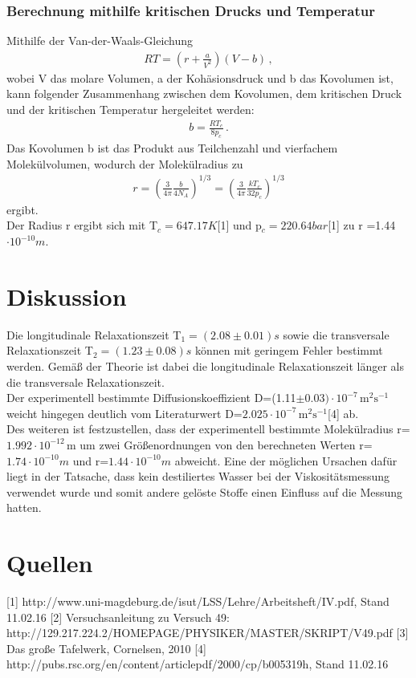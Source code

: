 \documentclass[]{scrartcl}
\begin{document}
\subsubsection{Berechnung mithilfe kritischen Drucks und Temperatur}
Mithilfe der Van-der-Waals-Gleichung 
\begin{align*}
RT = \left( r+\frac{a}{V^2}\right) (V-b)\, ,
\end{align*}
wobei V das molare Volumen, a der Kohäsionsdruck und b das Kovolumen ist, kann folgender Zusammenhang zwischen dem Kovolumen, dem kritischen Druck und der kritischen Temperatur hergeleitet werden:
\begin{align*}
b = \frac{RT_c}{8p_c}\,.
\end{align*}
Das Kovolumen b ist das Produkt aus Teilchenzahl und vierfachem Molekülvolumen, wodurch der Molekülradius zu
\begin{align*}
r= \left( \frac{3}{4\pi}\frac{b}{4N_A}\right) ^{1/3}=\left( \frac{3}{4\pi}\frac{kT_c}{32p_c}\right) ^{1/3}
\end{align*}
ergibt. \\
Der Radius r ergibt sich mit T$_c=647.17\si{K}$[1] und p$_c=220.64\si{bar}$[1] zu r =1.44$\cdot10^{-10}\si{m}$.

\section{Diskussion}
Die longitudinale Relaxationszeit T$_1=(2.08 \pm 0.01)\si{s}$ sowie die transversale Relaxationszeit T$_2=(1.23 \pm 0.08)\si{s}$ können mit geringem Fehler bestimmt werden. Gemäß der Theorie ist dabei die longitudinale Relaxationszeit länger als die transversale Relaxationszeit. \\
Der experimentell bestimmte Diffusionskoeffizient D=(1.11$\pm 0.03) \cdot10^{-7}\,\text{m}^2\text{s}^{-1}$ weicht hingegen deutlich vom Literaturwert D=$2.025\cdot10^{-7}\,\text{m}^2\text{s}^{-1}$[4] ab. \\
Des weiteren ist festzustellen, dass der experimentell bestimmte Molekülradius r=$ 1.992\cdot10^{-12}\,\text{m}$ um zwei Größenordnungen von den berechneten Werten r=$1.74\cdot10^{-10}\si{m}$ und r=$1.44\cdot10^{-10}\si{m}$ abweicht. Eine der möglichen Ursachen dafür liegt in der Tatsache, dass kein destiliertes Wasser bei der Viskositätsmessung verwendet wurde und somit andere gelöste Stoffe einen Einfluss auf die Messung hatten.

\section{Quellen}
[1] http://www.uni-magdeburg.de/isut/LSS/Lehre/Arbeitsheft/IV.pdf, Stand 11.02.16
[2] Versuchsanleitung zu Versuch 49:
http://129.217.224.2/HOMEPAGE/PHYSIKER/MASTER/SKRIPT/V49.pdf
[3] Das große Tafelwerk, Cornelsen, 2010
[4] http://pubs.rsc.org/en/content/articlepdf/2000/cp/b005319h, Stand 11.02.16
\end{document}
